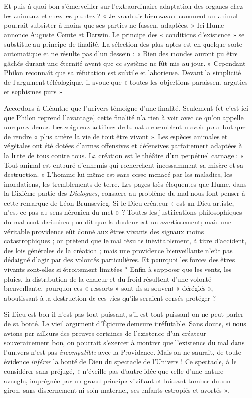 Et puis à quoi bon s’émerveiller sur l'extraordinaire
adaptation des organes chez les animaux et chez les
plantes ? « Je voudrais bien savoir comment un animal
pourrait subsister à moins que ses parties ne fussent
adaptées. » Ici Hume annonce Auguste Comte et Darwin.
Le principe des « conditions d’existence » se substitue au
principe de finalité. La sélection des plus aptes est en
quelque sorte automatique et ne résulte pas d’un dessein :
« Bien des mondes auront pu être gâchés durant une éternité
avant que ce système ne fût mis au jour. » Cependant
Philon reconnaît que sa réfutation est subtile et laborieuse.
Devant la simplicité de l’argument téléologique, il avoue
que « toutes les objections paraissent arguties et sophismes
purs ». 

Accordons à Cléanthe que l’univers témoigne d'une
finalité. Seulement (et c’est ici que Philon reprend l’avantage)
cette finalité n’a rien à voir avec ce qu'on appelle
une providence. Les soigneux artifices de la nature semblent
n’avoir pour but que de rendre « plus amère la vie de tout
être vivant ». Les espèces animales et végétales ont été
dotées d’armes offensives et défensives parfaitement
adaptées à la lutte de tous contre tous. La création est le
théâtre d’un perpétuel carnage : « Tout animal est entouré
d’ennemis qui recherchent incessamment sa misère et sa
destruction. » L’homme lui-même est sans cesse menacé
par les maladies, les inondations, les tremblements de
terre. Les pages très éloquentes que Hume, dans la
Dixième partie des {\it Dialogues}, consacre au problème du
mal nous font penser à cette remarque de Léon Brunscvicg. Si
le Dieu créateur « est un Dieu artiste, n’est-ce
pas au sens néronien du mot » ? Toutes les justifications
philosophiques du mal sont dérisoires ; on dit que la
douleur est un avertissement; mais une véritable providence eût
donné aux êtres vivants des signaux moins
catastrophiques ; on prétend que le mal résulte inévitablement,
à titre d’accident, des lois générales de la création ; mais
une providence bienveillante n’eût pas dédaigné
d’agir par des volontés particulières. Et pourquoi les
forces des êtres vivants sont-elles si étroitement limitées ?
Enfin à supposer que les vents, les pluies, la distribution
de la chaleur et du froid résultent d’une volonté bienveillante,
pourquoi ces « ressorts » sont-ils si souvent « déréglés »,
aboutissant à la destruction de ces vies qu’ils seraient
censés protéger ?

Si Dieu est bon il n’est pas tout-puissant, s’il est tout-puissant
on ne peut parler de sa bonté. Le vieil argument
d’Épicure demeure irréfutable. Sans doute, si nous avions
par ailleurs des preuves certaines de l’existence d’un
créateur souverainement bon, on pourrait s’exercer à
montrer que l’existence du mal dans l’univers n’est pas
{\it incompatible} avec la Providence. Mais on ne saurait, de
toute évidence {\it inférer} la bonté de Dieu du spectacle de
l’Univers ! Ce spectacle, à le considérer sans préjugé,
« n’éveille pas d’autre idée que celle d’une nature aveugle,
imprégnée par un grand principe vivifiant et laissant
tomber de son giron, sans discernement ni soin maternel,
ses enfants estropiés et avortés ».

